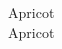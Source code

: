 \documentclass{article}
\begin{document}
\colorbox{Apricot}{Apricot}\\
\textcolor{Apricot}{Apricot}
\end{document}
